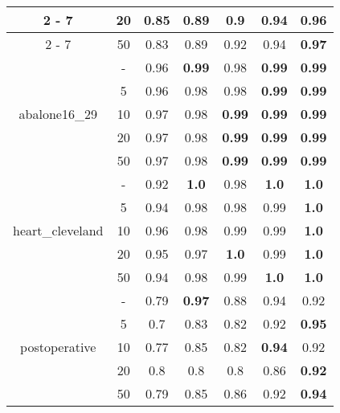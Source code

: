 \documentclass{article}%
\begin{document}
\begin{longtable}{c|c|ccccc}
\cline{2%
-%
7}%
&20&0.85&0.89&0.9&0.94&\textbf{0.96}\\%
\cline{2%
-%
7}%
&50&0.83&0.89&0.92&0.94&\textbf{0.97}\\%
\hline%
\multirow{5}{*}{abalone16\_29}&{-}&0.96&\textbf{0.99}&0.98&\textbf{0.99}&\textbf{0.99}\\%
\cline{2%
-%
7}%
&5&0.96&0.98&0.98&\textbf{0.99}&\textbf{0.99}\\%
\cline{2%
-%
7}%
&10&0.97&0.98&\textbf{0.99}&\textbf{0.99}&\textbf{0.99}\\%
\cline{2%
-%
7}%
&20&0.97&0.98&\textbf{0.99}&\textbf{0.99}&\textbf{0.99}\\%
\cline{2%
-%
7}%
&50&0.97&0.98&\textbf{0.99}&\textbf{0.99}&\textbf{0.99}\\%
\hline%
\multirow{5}{*}{heart\_cleveland}&{-}&0.92&\textbf{1.0}&0.98&\textbf{1.0}&\textbf{1.0}\\%
\cline{2%
-%
7}%
&5&0.94&0.98&0.98&0.99&\textbf{1.0}\\%
\cline{2%
-%
7}%
&10&0.96&0.98&0.99&0.99&\textbf{1.0}\\%
\cline{2%
-%
7}%
&20&0.95&0.97&\textbf{1.0}&0.99&\textbf{1.0}\\%
\cline{2%
-%
7}%
&50&0.94&0.98&0.99&\textbf{1.0}&\textbf{1.0}\\%
\hline%
\multirow{5}{*}{postoperative}&{-}&0.79&\textbf{0.97}&0.88&0.94&0.92\\%
\cline{2%
-%
7}%
&5&0.7&0.83&0.82&0.92&\textbf{0.95}\\%
\cline{2%
-%
7}%
&10&0.77&0.85&0.82&\textbf{0.94}&0.92\\%
\cline{2%
-%
7}%
&20&0.8&0.8&0.8&0.86&\textbf{0.92}\\%
\cline{2%
-%
7}%
&50&0.79&0.85&0.86&0.92&\textbf{0.94}\\%
\hline%
\end{longtable}

%
\end{document}
